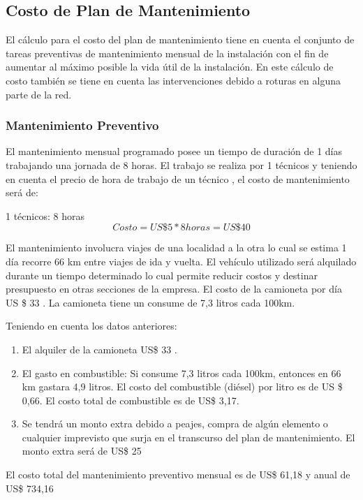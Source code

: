\subsection{Costo de Plan de Mantenimiento}

El cálculo para el costo del plan de mantenimiento tiene en cuenta el conjunto de tareas preventivas de mantenimiento mensual de la instalación con el fin de aumentar al máximo posible la vida útil de la instalación. En este cálculo de costo también se tiene en cuenta las intervenciones debido a roturas en alguna parte de la red. 

\subsubsection{Mantenimiento Preventivo}

El mantenimiento mensual programado posee un tiempo de duración de 1 días trabajando una jornada de 8 horas. El trabajo se realiza por 1 técnicos y teniendo en cuenta el precio de hora de trabajo de un técnico \cite{costo2tec}, el costo de mantenimiento será de:

1 técnicos: 8 horas 
\begin{equation}
Costo= US\$5* 8 horas= US\$40
\end{equation}

El mantenimiento involucra viajes de una localidad a la otra lo cual se estima 1 día recorre 66 km  entre viajes de ida y vuelta. El vehículo utilizado será alquilado durante un tiempo determinado lo cual permite reducir costos y destinar presupuesto en otras secciones de la empresa. El costo de la camioneta por día US \$ 33 \cite{costo20}. La camioneta tiene un consume de 7,3 litros cada 100km. 

Teniendo en cuenta los datos anteriores:

%
%

\begin{enumerate}


\item El alquiler de la camioneta US\$ 33 .


\item El gasto en combustible:
Si consume 7,3 litros cada 100km, entonces en 66 km gastara 4,9 litros. El costo del combustible (diésel) por litro es de US \$ 0,66. El costo total de combustible es de US\$ 3,17.

\item Se tendrá un monto extra debido a peajes, compra de algún elemento o cualquier imprevisto que surja en el transcurso del plan de mantenimiento.  El monto extra será de US\$ 25
\end{enumerate}
%
El costo total del mantenimiento preventivo mensual es de US\$ 61,18 y anual de US\$ 734,16
%
